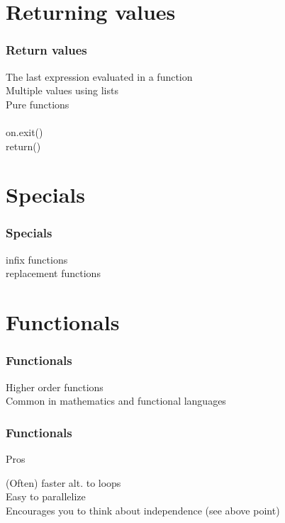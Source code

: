\documentclass{beamer}
\begin{document}
\section{Returning values}

\begin{frame}
	\frametitle{Return values}
	\begin{center}
		The last expression evaluated in a function \\
		Multiple values using lists \\
		Pure functions \\~\\
		
		on.exit() \\
		
		return()
	\end{center}
\end{frame}


\section{Specials}

\begin{frame}
	\frametitle{Specials}
	\begin{center}
		infix functions \\
		replacement functions \\
	\end{center}
\end{frame}

\section{Functionals}

\begin{frame}
	\frametitle{Functionals}
	\begin{center}
		Higher order functions \\
		Common in mathematics and functional languages\\
	\end{center}
\end{frame}


\begin{frame}
	\frametitle{Functionals}
	\centerline{Pros}
	\begin{center}
		(Often) faster alt. to loops \\
		Easy to parallelize \\
		Encourages you to think about independence (see above point)
	\end{center}
\end{frame}
\end{document}
